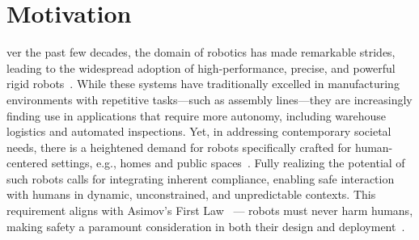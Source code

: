 \section{Motivation}\label{sec:introduction:motivation}

ver the past few decades, the domain of robotics has made remarkable strides, leading to the widespread adoption of high-performance, precise, and powerful rigid robots~\citep{todd1996fundamentals}. While these systems have traditionally excelled in manufacturing environments with repetitive tasks—such as assembly lines—they are increasingly finding use in applications that require more autonomy, including warehouse logistics and automated inspections. Yet, in addressing contemporary societal needs, there is a heightened demand for robots specifically crafted for human-centered settings, e.g., homes and public spaces~\citep{nahavandi2019industry, chibani2013ubiquitous, royakkers2015literature, he2021challenges}. Fully realizing the potential of such robots calls for integrating inherent compliance, enabling safe interaction with humans in dynamic, unconstrained, and unpredictable contexts. This requirement aligns with Asimov’s First Law~\citep{asimov1941three} — robots must never harm humans, making safety a paramount consideration in both their design and deployment~\citep{villani2018survey}.


